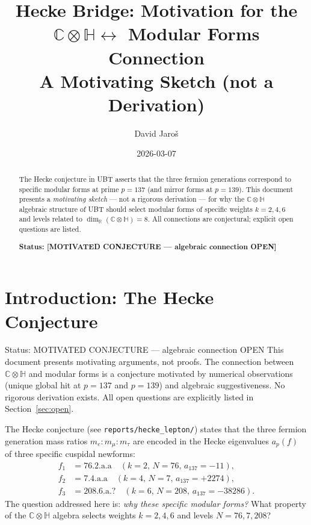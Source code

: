 \documentclass[12pt]{article}
\title{\textbf{Hecke Bridge: Motivation for the $\mathbb{C}\otimes\mathbb{H}
         \leftrightarrow$ Modular Forms Connection}\\
         \large A Motivating Sketch (not a Derivation)}
\author{David Jaroš}
\date{2026-03-07}
\theoremstyle{definition}
\theoremstyle{remark}
\begin{document}
  \maketitle

  \begin{abstract}
  The Hecke conjecture in UBT asserts that the three fermion generations correspond
  to specific modular forms at prime $p = 137$ (and mirror forms at $p = 139$).
  This document presents a \emph{motivating sketch} --- not a rigorous derivation ---
  for why the $\mathbb{C}\otimes\mathbb{H}$ algebraic structure of UBT should select
  modular forms of specific weights $k = 2, 4, 6$ and levels related to
  $\dim_{\mathbb{R}}(\mathbb{C}\otimes\mathbb{H}) = 8$.
  All connections are conjectural; explicit open questions are listed.

  \textbf{Status: [MOTIVATED CONJECTURE --- algebraic connection OPEN]}
  \end{abstract}
\fi

\section{Introduction: The Hecke Conjecture}
\label{sec:intro}

\begin{statusbox}{Status: MOTIVATED CONJECTURE — algebraic connection OPEN}
This document presents motivating arguments, not proofs.  The connection between
$\mathbb{C}\otimes\mathbb{H}$ and modular forms is a conjecture motivated by
numerical observations (unique global hit at $p = 137$ and $p = 139$) and
algebraic suggestiveness.  No rigorous derivation exists.  All open questions
are explicitly listed in Section~\ref{sec:open}.
\end{statusbox}

The Hecke conjecture (see \texttt{reports/hecke\_lepton/}) states that the three
fermion generation mass ratios $m_e : m_\mu : m_\tau$ are encoded in the Hecke
eigenvalues $a_p(f)$ of three specific cuspidal newforms:
\begin{align}
  f_1 &= \text{76.2.a.a} \quad (k=2,\, N=76,\, a_{137} = -11), \\
  f_2 &= \text{7.4.a.a}  \quad (k=4,\, N=7,\,  a_{137} = +2274), \\
  f_3 &= \text{208.6.a.?}\quad (k=6,\, N=208,\, a_{137} = -38286).
\end{align}
The question addressed here is: \emph{why these specific modular forms?}
What property of the $\mathbb{C}\otimes\mathbb{H}$ algebra selects weights
$k = 2, 4, 6$ and levels $N = 76, 7, 208$?
\end{document}
